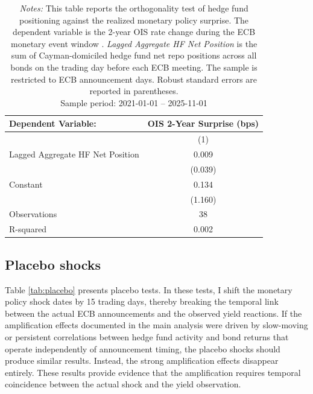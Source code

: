 \documentclass[english, 11pt, oneside]{article}
\begin{document}
\begin{table}[h!]
\centering
\caption{\textbf{Pre-existing Positioning and Monetary Policy Surprise}}
\footnotesize
\setlength{\tabcolsep}{8pt}
\renewcommand{\arraystretch}{1.1}
\begin{tabular}{l c}
\toprule
\textbf{Dependent Variable:} & \textbf{OIS 2-Year Surprise (bps)} \\
\midrule
 & (1) \\
\midrule
Lagged Aggregate HF Net Position & 0.009 \\
 & (0.039) \\
\addlinespace
Constant & 0.134 \\
 & (1.160) \\
\midrule
Observations & 38 \\
R-squared & 0.002 \\
\bottomrule
\end{tabular}
\label{tab:orthogonality}
\caption*{\textit{Notes:} This table reports the orthogonality test of hedge fund positioning against the realized monetary policy surprise. The dependent variable is the 2-year OIS rate change during the ECB monetary event window \citep{altavilla2019}. \textit{Lagged Aggregate HF Net Position} is the sum of Cayman-domiciled hedge fund net repo positions across all bonds on the trading day before each ECB meeting. The sample is restricted to ECB announcement days. Robust standard errors are reported in parentheses. \\ Sample period: 2021-01-01 -- 2025-11-01}
\end{table}

\clearpage
\subsection{Placebo shocks}
\label{subsec:placebo}

Table \ref{tab:placebo} presents placebo tests. In these tests, I shift the monetary policy shock dates by 15 trading days, thereby breaking the temporal link between the actual ECB announcements and the observed yield reactions. If the amplification effects documented in the main analysis were driven by slow-moving or persistent correlations between hedge fund activity and bond returns that operate independently of announcement timing, the placebo shocks should produce similar results. Instead, the strong amplification effects disappear entirely. These results provide evidence that the amplification requires temporal coincidence between the actual shock and the yield observation.
\end{document}
